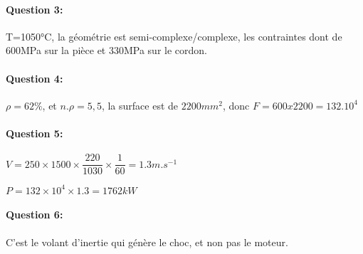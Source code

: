 \paragraph{Question 3:} T=1050°C, la géométrie est semi-complexe/complexe, les contraintes dont de 600MPa sur la pièce et 330MPa sur le cordon.

\paragraph{Question 4:} $\rho=62\%$, et $n.\rho=5,5$, la surface est de $2200mm^2$, donc $F=600x2200=132.10^4$
  
\paragraph{Question 5:} $V=250\times 1500\times \dfrac{220}{1030}\times \dfrac{1}{60}=1.3m.s^{-1}$

$P=132\times 10^4\times 1.3=1762kW$

\paragraph{Question 6:} C'est le volant d'inertie qui génère le choc, et non pas le moteur.


